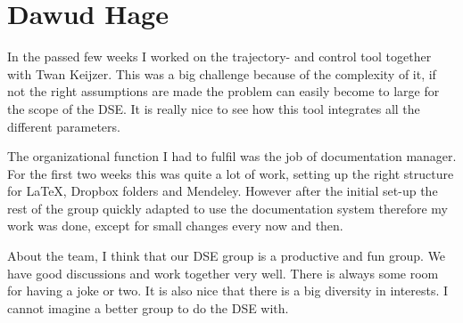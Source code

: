 \section{Dawud Hage}


In the passed few weeks I worked on the trajectory- and control tool together with Twan Keijzer. This was a big challenge because of the complexity of it, if not the right assumptions are made the problem can easily become to large for the scope of the DSE. It is really nice to see how this tool integrates all the different parameters.

The organizational function I had to fulfil was the job of documentation manager. For the first two weeks this was quite a lot of work, setting up the right structure for LaTeX, Dropbox folders and Mendeley. However after the initial set-up the rest of the group quickly adapted to use the documentation system therefore my work was done, except for small changes every now and then.

About the team, I think that our DSE group is a productive and fun group. We have good discussions and work together very well. There is always some room for having a joke or two. It is also nice that there is a big diversity in interests. I cannot imagine a better group to do the DSE with.